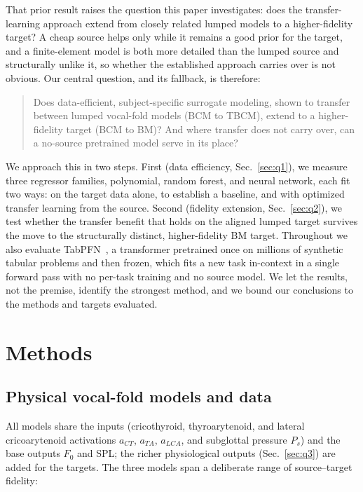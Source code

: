\documentclass[11pt]{article}
\begin{document}
That prior result raises the question this paper investigates: does the
transfer-learning approach extend from closely related lumped models to a
higher-fidelity target? A cheap source helps only while it remains a good prior
for the target, and a finite-element model is both more detailed than the lumped
source and structurally unlike it, so whether the established approach carries
over is not obvious. Our central question, and its fallback, is therefore:

\begin{quote}
Does data-efficient, subject-specific surrogate modeling, shown to transfer
between lumped vocal-fold models (BCM to TBCM), extend to a higher-fidelity
target (BCM to BM)? And where transfer does not carry over, can a no-source
pretrained model serve in its place?
\end{quote}

We approach this in two steps. First (data efficiency, Sec.~\ref{sec:q1}), we
measure three regressor families, polynomial, random forest, and neural network,
each fit two ways: on the target data alone, to establish a baseline, and with
optimized transfer learning from the source. Second (fidelity extension,
Sec.~\ref{sec:q2}), we test whether the transfer benefit that holds on the
aligned lumped target survives the move to the structurally distinct,
higher-fidelity BM target. Throughout we also evaluate
TabPFN~\cite{hollmann2023tabpfn}, a transformer pretrained once on millions of
synthetic tabular problems and then frozen, which fits a new task in-context in a
single forward pass with no per-task training and no source model. We let the
results, not the premise, identify the strongest method, and we bound our
conclusions to the methods and targets evaluated.

\section{Methods}

\subsection{Physical vocal-fold models and data}

All models share the inputs (cricothyroid, thyroarytenoid, and lateral
cricoarytenoid activations $a_{CT}$, $a_{TA}$, $a_{LCA}$, and subglottal pressure
$P_s$) and the base outputs $F_0$ and SPL; the richer physiological outputs
(Sec.~\ref{sec:q3}) are added for the targets. The three models span a deliberate
range of source--target fidelity:
\end{document}
